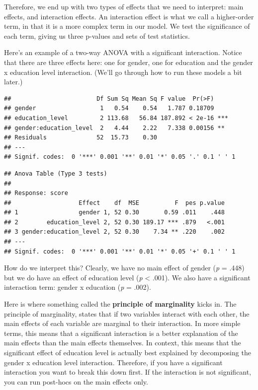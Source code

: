 \documentclass[
]{book}
\begin{document}
Therefore, we end up with two types of effects that we need to interpret: main effects, and interaction effects. An interaction effect is what we call a higher-order term, in that it is a more complex term in our model. We test the significance of each term, giving us three p-values and sets of test statistics.

Here's an example of a two-way ANOVA with a significant interaction. Notice that there are three effects here: one for gender, one for education and the gender x education level interaction. (We'll go through how to run these models a bit later.)

\begin{verbatim}
##                        Df Sum Sq Mean Sq F value  Pr(>F)    
## gender                  1   0.54    0.54   1.787 0.18709    
## education_level         2 113.68   56.84 187.892 < 2e-16 ***
## gender:education_level  2   4.44    2.22   7.338 0.00156 ** 
## Residuals              52  15.73    0.30                    
## ---
## Signif. codes:  0 '***' 0.001 '**' 0.01 '*' 0.05 '.' 0.1 ' ' 1
\end{verbatim}

\begin{verbatim}
## Anova Table (Type 3 tests)
## 
## Response: score
##                   Effect    df  MSE          F  pes p.value
## 1                 gender 1, 52 0.30       0.59 .011    .448
## 2        education_level 2, 52 0.30 189.17 *** .879   <.001
## 3 gender:education_level 2, 52 0.30    7.34 ** .220    .002
## ---
## Signif. codes:  0 '***' 0.001 '**' 0.01 '*' 0.05 '+' 0.1 ' ' 1
\end{verbatim}

How do we interpret this? Clearly, we have no main effect of gender (\emph{p} = .448) but we do have an effect of education level (\emph{p} \textless{} .001). We also have a significant interaction term: gender x education (\emph{p} = .002).

Here is where something called the \textbf{principle of marginality} kicks in. The principle of marginality, states that if two variables interact with each other, the main effects of each variable are marginal to their interaction. In more simple terms, this means that a significant interaction is a better explanation of the main effects than the main effects themselves. In context, this means that the significant effect of education level is actually best explained by decomposing the gender x education level interaction. Therefore, if you have a significant interaction you want to break this down first. If the interaction is not significant, you can run post-hocs on the main effects only.
\end{document}
